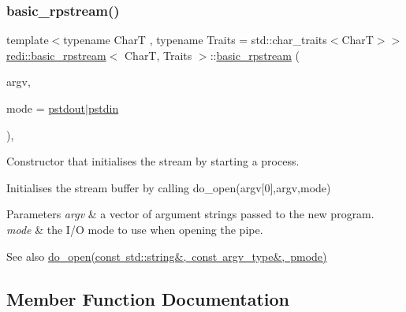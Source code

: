 \subsubsection{\texorpdfstring{basic\+\_\+rpstream()}{basic\_rpstream()}\hspace{0.1cm}{\footnotesize\ttfamily [3/3]}}
{\footnotesize\ttfamily template$<$typename CharT , typename Traits  = std\+::char\+\_\+traits$<$\+Char\+T$>$$>$ \\
\mbox{\hyperlink{classredi_1_1basic__rpstream}{redi\+::basic\+\_\+rpstream}}$<$ CharT, Traits $>$\+::\mbox{\hyperlink{classredi_1_1basic__rpstream}{basic\+\_\+rpstream}} (\begin{DoxyParamCaption}\item[{const \mbox{\hyperlink{structredi_1_1pstreams_af902b894b095c1875e96c10129489467}{argv\+\_\+type}} \&}]{argv,  }\item[{\mbox{\hyperlink{structredi_1_1pstreams_a1eae4aad88812af03a0fbb3ec13c50b7}{pmode}}}]{mode = {\ttfamily \mbox{\hyperlink{structredi_1_1pstreams_ad3c6d53a98de4566478b1c40c101a42b}{pstdout}}$\vert$\mbox{\hyperlink{structredi_1_1pstreams_a7a976ce992db857f86a0cc3352e42d3a}{pstdin}}} }\end{DoxyParamCaption})\hspace{0.3cm}{\ttfamily [inline]}, {\ttfamily [explicit]}}



Constructor that initialises the stream by starting a process. 

Initialises the stream buffer by calling {\ttfamily do\+\_\+open(argv\mbox{[}0\mbox{]},argv,mode)} 


\begin{DoxyParams}{Parameters}
{\em argv} & a vector of argument strings passed to the new program. \\
\hline
{\em mode} & the I/O mode to use when opening the pipe. \\
\hline
\end{DoxyParams}
\begin{DoxySeeAlso}{See also}
\mbox{\hyperlink{classredi_1_1pstream__common_a352b77fa600f7ebe0d8f1582be05ae4d}{do\+\_\+open(const std\+::string\&, const argv\+\_\+type\&, pmode)}} 
\end{DoxySeeAlso}


\subsection{Member Function Documentation}
\mbox{\label{classredi_1_1basic__rpstream_a3170d8e6c74d8280d89918bb3334f324}} 
